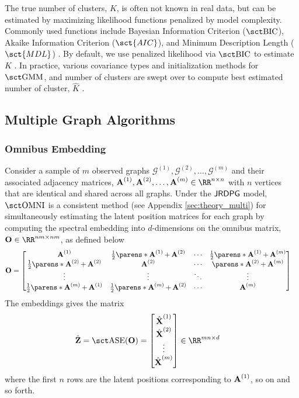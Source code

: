 The true number of clusters, $K$, is often not known in real data, but can be estimated by maximizing likelihood functions penalized by model complexity. Commonly used functions include Bayesian Information Criterion ($\bic$), Akaike Information Criterion ($\sct{AIC}$), and Minimum Description Length ($\sct{MDL}$) \cite{akaike1974new, schwarz1978estimating, rissanen1978modeling}. By default, we use penalized likelihood via $\bic$ to estimate $K$ \cite{priebe2019two}. In practice, various covariance types and initialization methods for $\gmm$, and number of clusters are swept over to compute best estimated number of cluster, $\hat K$ \cite{athey2019autogmm, scrucca2016mclust}.



\subsection{Multiple Graph Algorithms}\label{sec:multi_algo}
\subsubsection{Omnibus Embedding}\label{sec:omni}
Consider a sample of $m$ observed graphs $\mathcal{G}^{(1)}, \mathcal{G}^{(2)}, \ldots, \mathcal{G}^{(m)}$  and their associated adjacency matrices, $\A^{(1)}, \A^{(2)}, \ldots, \A^{(m)}\in\RR^{n\times n}$ with $n$ vertices that are identical and shared across all graphs. Under the $\operatorname{\mathsf{JRDPG}}$ model, $\omni$ is a consistent method (see Appendix \ref{sec:theory_multi}) for simultaneously estimating the latent position matrices for each graph by computing the spectral embedding into $d$-dimensions on the omnibus matrix, $\mathbf{O}\in\RR^{nm\times nm}$, as defined below
\begin{align*}
\mathbf{O} &= 
\begin{bmatrix}
\A^{(1)} & \frac{1}{2}\parens*{\A^{(1)}+\A^{(2)}} & \cdots & \frac{1}{2}\parens*{\A^{(1)}+\A^{(m)}}\\
\frac{1}{2}\parens*{\A^{(2)}+\A^{(2)}} & \A^{(2)} & \cdots & \parens*{\A^{(2)}+\A^{(m)}}\\
\vdots & \vdots & \ddots & \vdots\\
\frac{1}{2}\parens*{\A^{(m)}+\A^{(1)}} & \frac{1}{2}\parens*{\A^{(m)}+\A^{(2)}} & \cdots & \A^{(m)}
\end{bmatrix}
\end{align*}
The embeddings gives the matrix
\begin{align*}
    \hat{\mathbf{Z}} &= \ase(\mathbf{O}) = 
    \begin{bmatrix}
    \hat{\X}^{(1)}\\
    \hat{\X}^{(2)}\\
    \vdots\\
    \hat{\X}^{(m)}
    \end{bmatrix}\in\RR^{mn\times d}
\end{align*}
where the first $n$ rows are the latent positions corresponding to $\operatorname{\mathbf{A}}^{(1)}$, so on and so forth. 

